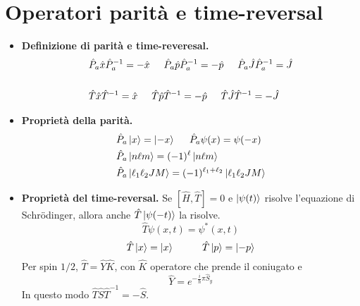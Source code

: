 \documentclass[11pt, a4paper]{scrartcl} %
\numberwithin{equation}{section}
\theoremstyle{style2}
\theoremstyle{style1}
\begin{document}
\section{Operatori parit\`a e time-reversal}
\begin{multicols}{2}
	\begin{itemize}
		\item {\sffamily \bfseries Definizione di parit\`a e time-reveresal.} 
			\begin{equation*}
				\begin{split}
					&\hat{P}_a \hat{x}\hat{P}_a^{-1}  = - \hat{x} \hspace{.5cm} \hat{P}_a \hat{p}\hat{P}_a ^{-1} = - \hat{p} \hspace{.5cm} \hat{P}_a \hat{J}\hat{P}_a^{-1} = \hat{J}\\
					\\
					&\hat{T}\hat{x}\hat{T}^{-1} = \hat{x} \hspace{.5cm} \hat{T}\hat{p}\hat{T}^{-1} =- \hat{p} \hspace{.5cm} \hat{T}\hat{J}\hat{T}^{-1} = - \hat{J}
				\end{split}
			\end{equation*}
			\item {\sffamily \bfseries Propriet\`a della parit\`a.} 
				\begin{equation*}
					\begin{split}
						&\hat{P}_a \ket{x} = \ket{-x}\hspace{.5cm} \hat{P}_a \psi (x) = \psi (-x)\\
						&\hat{P}_a \ket{n\ell m} = (-1)^{\ell } \ket{n\ell m} \\
						&\hat{P}_a \ket{\ell _1  \ell _2 JM} = (-1)^{\ell _1+\ell _2} \ket{\ell _1 \ell_ 2 JM} 
					\end{split}
				\end{equation*}
				\item {\sffamily \bfseries Propriet\`a del time-reversal.} 
					Se $[\hat{H},\hat{T}] =0$ e $\ket{\psi (t)}  $ risolve l'equazione di Schr\"odinger, allora anche $\hat{T} \ket{\psi (-t)} $ la risolve.
					\begin{equation}
						\hat{T}\psi (x,t) = \psi ^*(x,t)
					\end{equation}
					\begin{equation}
						\hat{T}\ket{x} = \ket{x} \hspace{1cm}\hat{T}\ket{p} = \ket{-p} 
					\end{equation}
					Per spin $1 / 2$, $\hat{T} = \hat{Y} \hat{K}$, con $\hat{K}$ operatore che prende il coniugato e 
					\begin{equation}
						\hat{Y}= e^{-\frac{i}{\hbar }\pi \hat{S}_y} 
					\end{equation}
					In questo modo $\hat{T}\hat{S}\hat{T}^{-1} = - \hat{S}$.
	\end{itemize}
\end{multicols}
\end{document}
